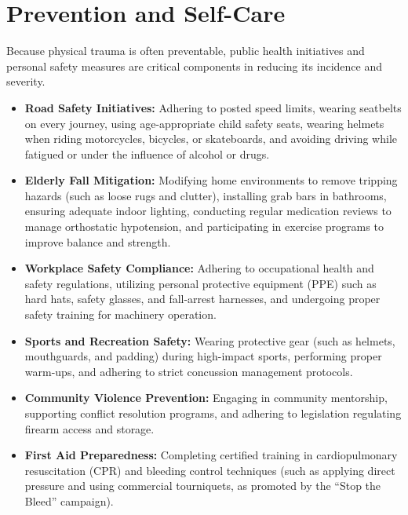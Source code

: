 \section*{Prevention and Self-Care}
Because physical trauma is often preventable, public health initiatives and personal safety measures are critical components in reducing its incidence and severity.
\begin{itemize}
    \item \textbf{Road Safety Initiatives:} Adhering to posted speed limits, wearing seatbelts on every journey, using age-appropriate child safety seats, wearing helmets when riding motorcycles, bicycles, or skateboards, and avoiding driving while fatigued or under the influence of alcohol or drugs.
    \item \textbf{Elderly Fall Mitigation:} Modifying home environments to remove tripping hazards (such as loose rugs and clutter), installing grab bars in bathrooms, ensuring adequate indoor lighting, conducting regular medication reviews to manage orthostatic hypotension, and participating in exercise programs to improve balance and strength.
    \item \textbf{Workplace Safety Compliance:} Adhering to occupational health and safety regulations, utilizing personal protective equipment (PPE) such as hard hats, safety glasses, and fall-arrest harnesses, and undergoing proper safety training for machinery operation.
    \item \textbf{Sports and Recreation Safety:} Wearing protective gear (such as helmets, mouthguards, and padding) during high-impact sports, performing proper warm-ups, and adhering to strict concussion management protocols.
    \item \textbf{Community Violence Prevention:} Engaging in community mentorship, supporting conflict resolution programs, and adhering to legislation regulating firearm access and storage.
    \item \textbf{First Aid Preparedness:} Completing certified training in cardiopulmonary resuscitation (CPR) and bleeding control techniques (such as applying direct pressure and using commercial tourniquets, as promoted by the ``Stop the Bleed'' campaign).
\end{itemize}

